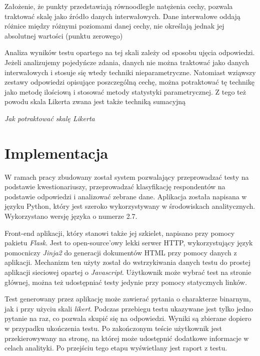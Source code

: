 \documentclass[12pt,a4paper,oneside]{report} %
\begin{document}
Założenie, że punkty przedstawiają równoodległe natężenia cechy, pozwala traktować skalę jako źródło danych interwałowych. Dane interwałowe oddają różnice między różnymi poziomami danej cechy, nie określają jednak jej absolutnej wartości (punktu zerowego)  \cite{bertram}

Analiza wyników testu opartego na tej skali zależy od sposobu ujęcia odpowiedzi. Jeżeli analizujemy pojedyńcze zdania, danych nie można traktować jako danych interwałowych i stosuje się wtedy techniki nieparametryczne. Natomiast wziąwszy zestawy odpowiedzi opisujące poszczególną cechę, można potraktować tę technikę jako metodę ilościową i stosować metody statystyki parametrycznej. \cite{joe} Z tego też powodu skala Likerta zwana jest także techniką sumacyjną

\emph{Jak potraktować skalę Likerta}









\chapter{Implementacja}

W ramach pracy zbudowany został system pozwalający przeprowadzać testy na podstawie kwestionariuszy, przeprowadzać klasyfikację respondentów na podstawie odpowiedzi i analizować zebrane dane. Aplikacja została napisana w języku Python, który jest szeroko wykorzystywany w środowiskach analitycznych. Wykorzystano wersję języka o numerze 2.7.

Front-end aplikacji, który stanowi także jej szkielet, napisano przy pomocy pakietu \emph{Flask}. Jest to open-source'owy lekki serwer HTTP, wykorzystujący język pomocniczy \emph{Jinja2} do generacji dokumentów HTML przy pomocy danych z aplikacji. Mechanizm ten użyty został do wstrzykiwania danych testu do prostej aplikacji sieciowej opartej o \emph{Javascript}. Użytkownik może wybrać test na stronie głównej, można też udostępniać testy jedynie przy pomocy statycznych linków.

Test generowany przez aplikację może zawierać pytania o charakterze binarnym, jak i przy użyciu skali \emph{likert}. Podczas przebiegu testu ukazywane jest tylko jedno pytanie na raz, co pozwala skupić się na odpowiedzi. Wyniki są zbierane dopiero w przypadku ukończenia testu. Po zakończonym teście użytkownik jest przekierowywany na stronę, na której może udostępnić dodatkowe informacje w celach analityki. Po przejściu tego etapu wyświetlany jest raport z testu.
\end{document}
